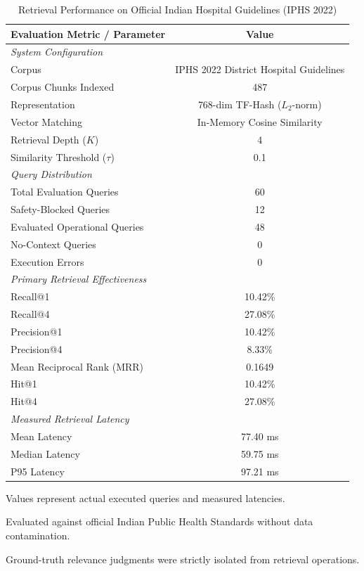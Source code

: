 \begin{table}[t]
\centering
\caption{Retrieval Performance on Official Indian Hospital Guidelines (IPHS 2022)}
\label{tab:iphs_retrieval}
\begin{tabular}{lc}
\hline
\textbf{Evaluation Metric / Parameter} & \textbf{Value} \\
\hline
\multicolumn{2}{l}{\textit{System Configuration}} \\
Corpus & IPHS 2022 District Hospital Guidelines \\
Corpus Chunks Indexed & 487 \\
Representation & 768-dim TF-Hash ($L_2$-norm) \\
Vector Matching & In-Memory Cosine Similarity \\
Retrieval Depth ($K$) & 4 \\
Similarity Threshold ($\tau$) & 0.1 \\
\hline
\multicolumn{2}{l}{\textit{Query Distribution}} \\
Total Evaluation Queries & 60 \\
Safety-Blocked Queries & 12 \\
Evaluated Operational Queries & 48 \\
No-Context Queries & 0 \\
Execution Errors & 0 \\
\hline
\multicolumn{2}{l}{\textit{Primary Retrieval Effectiveness}} \\
Recall@1 & 10.42\% \\
Recall@4 & 27.08\% \\
Precision@1 & 10.42\% \\
Precision@4 & 8.33\% \\
Mean Reciprocal Rank (MRR) & 0.1649 \\
Hit@1 & 10.42\% \\
Hit@4 & 27.08\% \\
\hline
\multicolumn{2}{l}{\textit{Measured Retrieval Latency}} \\
Mean Latency & 77.40 ms \\
Median Latency & 59.75 ms \\
P95 Latency & 97.21 ms \\
\hline
\end{tabular}
\begin{tablenotes}
\small
\item Values represent actual executed queries and measured latencies.
\item Evaluated against official Indian Public Health Standards without data contamination.
\item Ground-truth relevance judgments were strictly isolated from retrieval operations.
\end{tablenotes}
\end{table}
